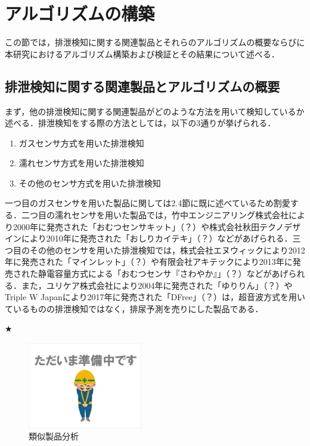 \section{アルゴリズムの構築}\label{chap:3.3}
この節では，排泄検知に関する関連製品とそれらのアルゴリズムの概要ならびに本研究におけるアルゴリズム構築および検証とその結果について述べる．

\subsection{排泄検知に関する関連製品とアルゴリズムの概要}\label{chap:3.3.1}
まず，他の排泄検知に関する関連製品がどのような方法を用いて検知しているか述べる．排泄検知をする際の方法としては，以下の3通りが挙げられる．

\begin{enumerate}
\item ガスセンサ方式を用いた排泄検知
\item 濡れセンサ方式を用いた排泄検知
\item その他のセンサ方式を用いた排泄検知
\end{enumerate}

一つ目のガスセンサを用いた製品に関しては2.4節に既に述べているため割愛する．二つ目の濡れセンサを用いた製品では，竹中エンジニアリング株式会社により2000年に発売された「おむつセンサキット」（？）や株式会社秋田テクノデザインにより2010年に発売された「おしりカイテキ」（？）などがあげられる．三つ目のその他のセンサを用いた排泄検知では，株式会社エヌウィックにより2012年に発売された「マインレット」（？）や有限会社アキテックにより2013年に発売された静電容量方式による「おむつセンサ『さわやか』」（？）などがあげられる．また，ユリケア株式会社により2004年に発売された「ゆりりん」（？）やTriple W Japanにより2017年に発売された「DFree」（？）は，超音波方式を用いているものの排泄検知ではなく，排尿予測を売りにした製品である．

★
\begin{figure}[htbp]
   \centering
   \includegraphics[width=5cm]{./fig/temp.eps}
   \caption{類似製品分析 \cite{mic17a} }
   \label{mic17a}
\end{figure}

